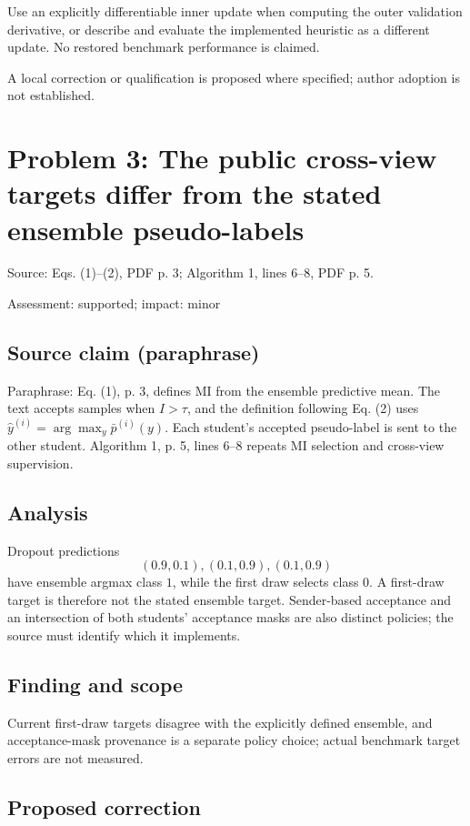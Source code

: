 \documentclass[11pt]{article}
\begin{document}
Use an explicitly differentiable inner update when computing the outer validation derivative, or describe and evaluate the implemented heuristic as a different update. No restored benchmark performance is claimed.

A local correction or qualification is proposed where specified; author adoption is not established.

\section*{Problem 3: The public cross-view targets differ from the stated ensemble pseudo-labels}

Source: Eqs. (1)–(2), PDF p. 3; Algorithm 1, lines 6–8, PDF p. 5.

Assessment: supported; impact: minor

\subsection*{Source claim (paraphrase)}

Paraphrase: Eq. (1), p. 3, defines MI from the ensemble predictive mean. The text accepts samples when \(I>\tau\), and the definition following Eq. (2) uses \(\hat y^{(i)}=\arg\max_y\bar p^{(i)}(y)\). Each student’s accepted pseudo-label is sent to the other student. Algorithm 1, p. 5, lines 6–8 repeats MI selection and cross-view supervision.

\subsection*{Analysis}

Dropout predictions \[(0.9,0.1),(0.1,0.9),(0.1,0.9)\] have ensemble argmax class \(1\), while the first draw selects class \(0\). A first-draw target is therefore not the stated ensemble target. Sender-based acceptance and an intersection of both students' acceptance masks are also distinct policies; the source must identify which it implements.

\subsection*{Finding and scope}

Current first-draw targets disagree with the explicitly defined ensemble, and acceptance-mask provenance is a separate policy choice; actual benchmark target errors are not measured.

\subsection*{Proposed correction}
\end{document}
